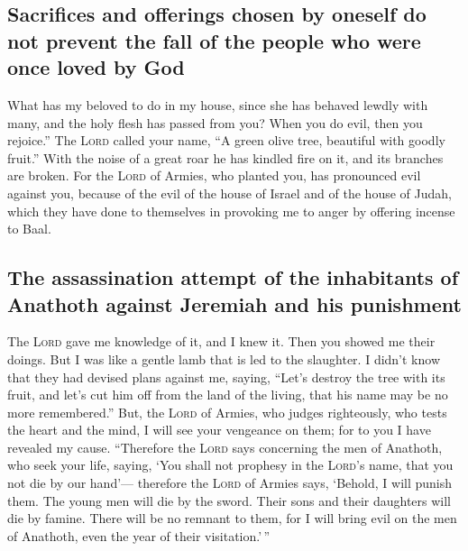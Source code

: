 \hypertarget{sacrifices-and-offerings-chosen-by-oneself-do-not-prevent-the-fall-of-the-people-who-were-once-loved-by-god}{%
\subsection{Sacrifices and offerings chosen by oneself do not prevent
the fall of the people who were once loved by
God}\label{sacrifices-and-offerings-chosen-by-oneself-do-not-prevent-the-fall-of-the-people-who-were-once-loved-by-god}}

 What has my beloved to do in my house, since she has
behaved lewdly with many, and the holy flesh has passed from you? When
you do evil, then you rejoice.''  The \textsc{Lord}
called your name, ``A green olive tree, beautiful with goodly fruit.''
With the noise of a great roar he has kindled fire on it, and its
branches are broken.  For the \textsc{Lord} of Armies,
who planted you, has pronounced evil against you, because of the evil of
the house of Israel and of the house of Judah, which they have done to
themselves in provoking me to anger by offering incense to Baal.

\hypertarget{the-assassination-attempt-of-the-inhabitants-of-anathoth-against-jeremiah-and-his-punishment}{%
\subsection{The assassination attempt of the inhabitants of Anathoth
against Jeremiah and his
punishment}\label{the-assassination-attempt-of-the-inhabitants-of-anathoth-against-jeremiah-and-his-punishment}}

 The \textsc{Lord} gave me knowledge of it, and I knew
it. Then you showed me their doings.  But I was like a
gentle lamb that is led to the slaughter. I didn't know that they had
devised plans against me, saying, ``Let's destroy the tree with its
fruit, and let's cut him off from the land of the living, that his name
may be no more remembered.''  But, the \textsc{Lord} of
Armies, who judges righteously, who tests the heart and the mind, I will
see your vengeance on them; for to you I have revealed my cause.
 ``Therefore the \textsc{Lord} says concerning the men of
Anathoth, who seek your life, saying, `You shall not prophesy in the
\textsc{Lord}'s name, that you not die by our hand'--- 
therefore the \textsc{Lord} of Armies says, `Behold, I will punish them.
The young men will die by the sword. Their sons and their daughters will
die by famine.  There will be no remnant to them, for I
will bring evil on the men of Anathoth, even the year of their
visitation.'\,''

